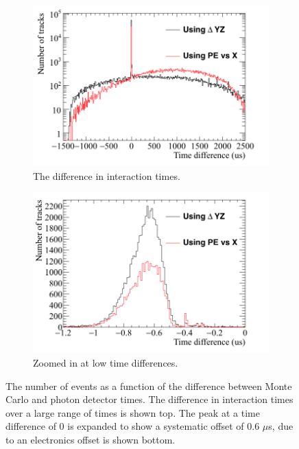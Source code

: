 \begin{figure}[h!]
  \centering
  \begin{subfigure}{0.6\textwidth}
    \centering
    \includegraphics[width=\textwidth]{Pred_Reco_T_Full}
    \caption{The difference in interaction times.}
  \end{subfigure}
  \begin{subfigure}{0.6\textwidth}
    \centering
    \includegraphics[width=\textwidth]{Pred_Reco_T_Zoom}
    \caption{Zoomed in at low time differences.}
  \end{subfigure}
  \caption[The number of events as a function of the difference between Monte Carlo and photon detector times]
          {The number of events as a function of the difference between Monte Carlo and photon detector times. The difference in interaction times over a large range of times is shown top. The peak at a time difference of 0 is expanded to show a systematic offset of 0.6 $\mu$s, due to an electronics offset is shown bottom.}
          \label{fig:PD_MCPDDiff}
\end{figure}

